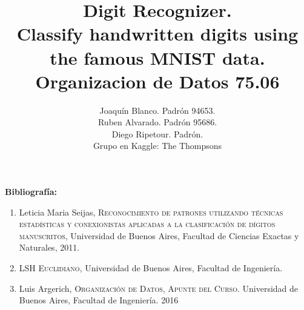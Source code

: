 \documentclass[a4paper,11pt]{report}
\title{Digit Recognizer. \\ 
  Classify handwritten digits using the famous MNIST data.\\
  Organizacion de Datos 75.06}
\author{Joaquín Blanco. Padrón 94653.\\
  Ruben Alvarado. Padrón 95686.\\
  Diego Ripetour. Padrón.\\
  Grupo en Kaggle: The Thompsons}
\begin{document}
\maketitle
\tableofcontents







\textbf{Bibliografía:}
\begin{enumerate}
  \item Leticia Maria Seijas, \textsc{Reconocimiento de patrones utilizando técnicas estadísticas y conexionistas aplicadas a la clasificación de dígitos manuscritos}, Universidad de Buenos Aires, Facultad de Ciencias Exactas y Naturales, 2011.
  \item \textsc{LSH Euclidiano}, Universidad de Buenos Aires, Facultad de Ingeniería.
  \item Luis Argerich, \textsc{Organización de Datos, Apunte del Curso.} Universidad de Buenos Aires, Facultad de Ingeniería. 2016

\end{enumerate}
\end{document}
